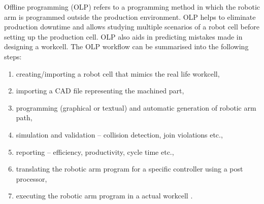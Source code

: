 Offline programming  (OLP) refers to a programming method in which the robotic arm is programmed outside the production environment. OLP helps to eliminate production downtime and allows studying multiple scenarios of a robot cell before setting up the production cell. OLP also aids in predicting mistakes made in designing a workcell. The OLP workflow can be summarised into the following steps:

\begin{enumerate}
  \item creating/importing a robot cell that mimics the real life workcell,
  \item importing a CAD file representing the machined part,
  \item programming (graphical or textual) and automatic generation of robotic arm path,
  \item simulation and validation -- collision detection, join violations etc.,
  \item reporting -- efficiency, productivity, cycle time etc.,
  \item translating the robotic arm program for a specific controller using a post processor,
  \item executing the robotic arm program in a actual workcell \cite{offlinesteps}.
\end{enumerate}



